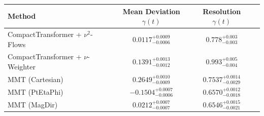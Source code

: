     \begin{tabular}{lccc}
        \toprule
        Method & Mean Deviation $\gamma(t)$ & Resolution $\gamma(t)$ \\
        \midrule
        CompactTransformer + $\nu^2$-Flows & $0.0117^{+0.0009}_{-0.0006}$ & $0.778^{+0.003}_{-0.003}$ \\
        CompactTransformer + $\nu$-Weighter & $0.1391^{+0.0013}_{-0.0012}$ & $0.993^{+0.005}_{-0.004}$ \\
        MMT (Cartesian) & $0.2649^{+0.0010}_{-0.0009}$ & $0.7537^{+0.0014}_{-0.0029}$ \\
        MMT (PtEtaPhi) & $-0.1504^{+0.0007}_{-0.0006}$ & $0.6570^{+0.0012}_{-0.0018}$ \\
        MMT (MagDir) & $0.0212^{+0.0007}_{-0.0007}$ & $0.6546^{+0.0015}_{-0.0021}$ \\
        \bottomrule
    \end{tabular}